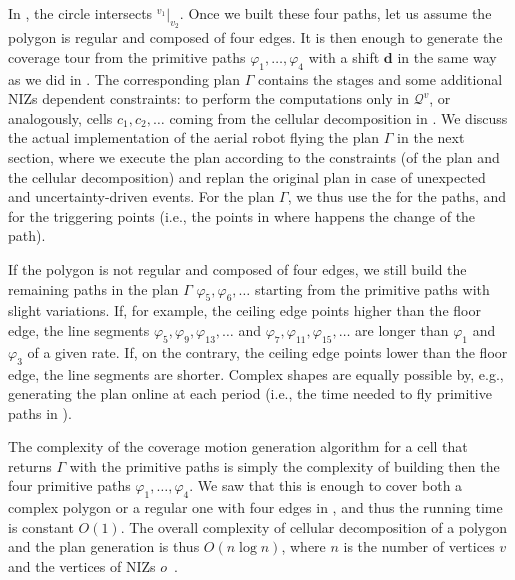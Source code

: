 In , the circle intersects ${}^{v_1}|_{v_2}$. Once we built these four paths, let us assume the polygon is regular and composed of four edges. It is then enough to generate the coverage tour from the primitive paths $\varphi_1,\dots,\varphi_4$ with a shift $\mathbf{d}$ in the same way as we did in . The corresponding plan $\Gamma$ contains the stages and some additional NIZs dependent constraints: to perform the computations only in $\mathcal{Q}^v$, or analogously, cells $c_1,c_2,\dots$ coming from the cellular decomposition in . We discuss the actual implementation of the aerial robot flying the plan $\Gamma$ in the next section, where we execute the plan according to the constraints (of the plan and the cellular decomposition) and replan the original plan in case of unexpected and uncertainty-driven events. For the plan $\Gamma$, we thus use the  for the paths, and  for the triggering points (i.e., the points in  where happens the change of the path).

If the polygon is not regular and composed of four edges, we still build the remaining paths in the plan $\Gamma$ $\varphi_5,\varphi_6,\dots$ starting from the primitive paths with slight variations. If, for example, the ceiling edge points higher than the floor edge, the line segments $\varphi_5,\varphi_9,\varphi_{13},\dots$ and $\varphi_7,\varphi_{11},\varphi_{15},\dots$ are longer than $\varphi_{1}$ and $\varphi_3$ of a given rate. If, on the contrary, the ceiling edge points lower than the floor edge, the line segments are shorter. Complex shapes are equally possible by, e.g., generating the plan online at each period (i.e., the time needed to fly primitive paths in ). 

The complexity of the coverage motion generation algorithm for a cell that returns $\Gamma$ with the primitive paths is simply the complexity of building then the four primitive paths $\varphi_1,\dots,\varphi_4$. We saw that this is enough to cover both a complex polygon or a regular one with four edges in , and thus the running time is constant $O(1)$. The overall complexity of cellular decomposition of a polygon and the plan generation is thus $O(n\log{n})$, where $n$ is the number of vertices $v$ and the vertices of NIZs $o$~\citep{choset2000exact}.


